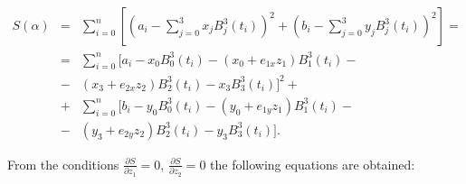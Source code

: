 \documentclass[12pt]{article}
\begin{document}
 \begin{eqnarray}
 S(\alpha ) &=& \sum _{i=0}^{n}\left[\left(a_{i} -\sum _{j=0}^{3}x_{j} B_{j}^{3} (t_{i} ) \right)^{2} +\left(b_{i} -\sum _{j=0}^{3}y_{j} B_{j}^{3} (t_{i} ) \right)^{2} \right] = \nonumber \\ 
 &=& \sum _{i=0}^{n}[a_{i} -x_{0} B_{0}^{3} (t_{i} ) - (x_{0} +e_{1x} z_{1} ) B_{1}^{3} (t_{i} ) - \nonumber \\
 &-& (x_{3} +e_{2x} z_{2} ) B_{2}^{3} (t_{i} )-x_{3} B_{3}^{3} (t_{i} )] ^{2} + \nonumber \\
 &+& \sum _{i=0}^{n}[b_{i} -y_{0} B_{0}^{3} (t_{i} ) -  (y_{0} +e_{1y} z_{1} ) B_{1}^{3} (t_{i} ) - \nonumber \\
 &-& (y_{3} +e_{2y} z_{2} ) B_{2}^{3} (t_{i} )-y_{3} B_{3}^{3} (t_{i} )]. 
 \end{eqnarray}
 
 From the conditions $\frac{\partial S}{\partial z_{1} } =0$, $\frac{\partial S}{\partial z_{2} } =0$ the following equations are obtained:
 
\end{document}
